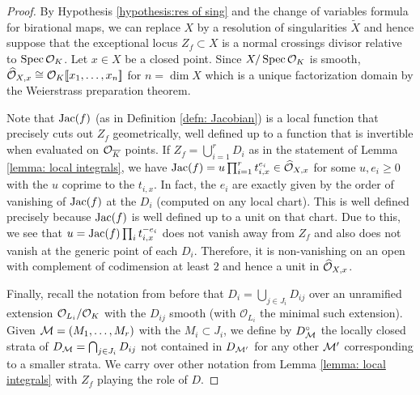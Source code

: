 \documentclass[10pt]{article}
\theoremstyle{plain}
\theoremstyle{definition}
\numberwithin{equation}{section}
\begin{document}
\begin{proof}

By Hypothesis \ref{hypothesis:res of sing} and the change of variables formula for birational maps, we can replace $X$ by a resolution of singularities $\widetilde{X}$ and hence suppose that the exceptional locus $Z_f \subset X$ is a normal crossings divisor relative to $\operatorname{Spec} {{\mathcal O}_{K}}$. Let $x \in X$ be a closed point. Since $X/\operatorname{Spec} {{\mathcal O}_{K}}$ is smooth, $\widehat{{\mathcal O}}_{X,x} \cong { {\mathcal O} _{K}}[\![x_1,\dots,x_n]\!]$ for $n = \dim X$ which is a unique factorization domain by the Weierstrass preparation theorem.

Note that $\operatorname{Jac}(f)$ (as in Definition \ref{defn: Jacobian}) is a local function that precisely cuts out $Z_f$ geometrically, well defined up to a function that is invertible when evaluated on ${\mathcal O}_{\overline{K}}$ points. If $Z_f = \bigcup_{i=1}^rD_i$ as in the statement of Lemma \ref{lemma: local integrals}, we have $\operatorname{Jac}(f) = u\prod_{i=1}^rt_{i,x}^{e_i} \in \widehat{{\mathcal O}}_{X,x}$ for some $u,e_i \geq 0$ with the $u$ coprime to the $t_{i,x}$. In fact, the $e_i$ are exactly given by the order of vanishing of $\operatorname{Jac}(f)$ at the $D_i$ (computed on any local chart). This is well defined precisely because $\operatorname{Jac}(f)$ is well defined up to a unit on that chart. Due to this, we see that
$u = \operatorname{Jac}(f) \prod_i t_{i,x}^{-e_i}$ does not vanish away from $Z_f$ and also does not vanish at the generic point of each $D_i$. Therefore, it is non-vanishing on an open with complement of codimension at least $2$ and hence a unit in $\widehat{{\mathcal O}}_{X,x}$.

Finally, recall the notation from before that $D_i = \bigcup_{j \in J_i}D_{ij}$ over an unramified extension $\mathcal O_{L_i}/{{\mathcal O}_{K}}$ with the $D_{ij}$ smooth (with $\mathcal O_{L_i}$ the minimal such extension). Given ${\mathcal M} = (M_1,\dots,M_r)$ with the $M_i \subset J_i$, we define by $D_{{\mathcal M}}^\circ$ the locally closed strata of $D_{{\mathcal M}} = \bigcap_{j \in J_i} D_{ij}$ not contained in $D_{{\mathcal M}'}$ for any other ${\mathcal M}'$ corresponding to a smaller strata. We carry over other notation from Lemma \ref{lemma: local integrals} with $Z_f$ playing the role of $D$.


\end{proof}
\end{document}
